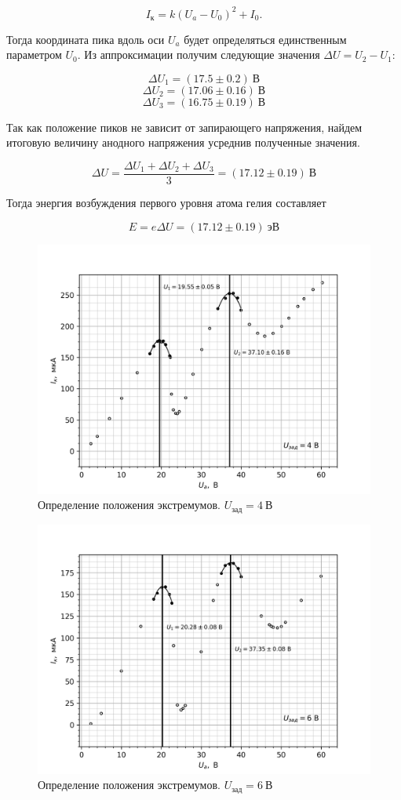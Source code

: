 \documentclass[14pt, a4paper]{report}
\begin{document}
\[I_к=k(U_a-U_0)^2+I_0\text{.}\]

Тогда координата пика вдоль оси $U_a$ будет определяться единственным параметром $U_0$. Из аппроксимации получим следующие значения $\Delta U=U_2-U_1$:

\[\Delta U_1=(17.5\pm0.2)\ В\]
\[\Delta U_2=(17.06\pm0.16)\ В\]
\[\Delta U_3=(16.75\pm0.19)\ В\]

Так как положение пиков не зависит от запирающего напряжения, найдем итоговую величину анодного напряжения усреднив полученные значения.

\[\Delta U=\frac{\Delta U_1+\Delta U_2+\Delta U_3}{3}=(17.12\pm0.19)\ В\]

Тогда энергия возбуждения первого уровня атома гелия составляет

\[E=e\Delta U=(17.12\pm0.19)\ эВ\]

\begin{figure}[H]
\centering
\includegraphics[scale=0.9]{../images/521-5}
\caption{Определение положения экстремумов. $U_{зад}=4\ \text{В}$}
\end{figure}

\begin{figure}[H]
\centering
\includegraphics[scale=0.9]{../images/521-6}
\caption{Определение положения экстремумов. $U_{зад}=6\ \text{В}$}
\end{figure}
\end{document}
